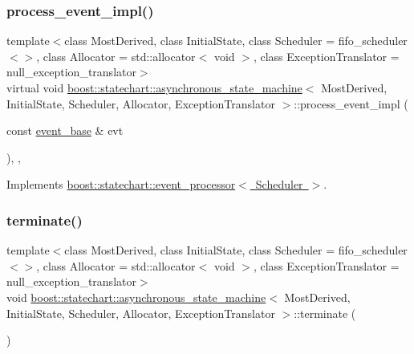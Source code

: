 \subsubsection{\texorpdfstring{process\+\_\+event\+\_\+impl()}{process\_event\_impl()}}
{\footnotesize\ttfamily template$<$class Most\+Derived, class Initial\+State, class Scheduler = fifo\+\_\+scheduler$<$$>$, class Allocator = std\+::allocator$<$ void $>$, class Exception\+Translator = null\+\_\+exception\+\_\+translator$>$ \\
virtual void \mbox{\hyperlink{classboost_1_1statechart_1_1asynchronous__state__machine}{boost\+::statechart\+::asynchronous\+\_\+state\+\_\+machine}}$<$ Most\+Derived, Initial\+State, Scheduler, Allocator, Exception\+Translator $>$\+::process\+\_\+event\+\_\+impl (\begin{DoxyParamCaption}\item[{const \mbox{\hyperlink{classboost_1_1statechart_1_1event__base}{event\+\_\+base}} \&}]{evt }\end{DoxyParamCaption})\hspace{0.3cm}{\ttfamily [inline]}, {\ttfamily [private]}, {\ttfamily [virtual]}}



Implements \mbox{\hyperlink{classboost_1_1statechart_1_1event__processor_a5db03beb4d6c1545e7bb9584cd60b500}{boost\+::statechart\+::event\+\_\+processor$<$ Scheduler $>$}}.

\mbox{\label{classboost_1_1statechart_1_1asynchronous__state__machine_aeb5ac2e3a0f539b313544357ae2be26d}} 
\subsubsection{\texorpdfstring{terminate()}{terminate()}}
{\footnotesize\ttfamily template$<$class Most\+Derived, class Initial\+State, class Scheduler = fifo\+\_\+scheduler$<$$>$, class Allocator = std\+::allocator$<$ void $>$, class Exception\+Translator = null\+\_\+exception\+\_\+translator$>$ \\
void \mbox{\hyperlink{classboost_1_1statechart_1_1asynchronous__state__machine}{boost\+::statechart\+::asynchronous\+\_\+state\+\_\+machine}}$<$ Most\+Derived, Initial\+State, Scheduler, Allocator, Exception\+Translator $>$\+::terminate (\begin{DoxyParamCaption}{ }\end{DoxyParamCaption})\hspace{0.3cm}{\ttfamily [inline]}}

